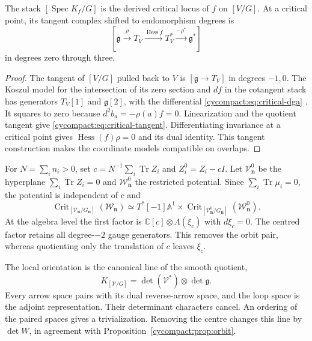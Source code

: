 \begin{proposition}\label{cycompact:prop:critical-gauge}
The stack $[\operatorname{Spec}K_f/G]$ is the derived
critical locus of $f$ on $[V/G]$. At a critical point,
its tangent complex shifted to endomorphism degrees is
\begin{equation}\label{cycompact:eq:critical-tangent}
 [\mathfrak g\xrightarrow{\rho}T_V
 \xrightarrow{\operatorname{Hess}f}T_V^*
 \xrightarrow{-\rho^*}\mathfrak g^*]
\end{equation}
in degrees zero through three.
\end{proposition}

\begin{proof}
The tangent of $[V/G]$ pulled back to $V$ is
$[\mathfrak g\to T_V]$ in degrees $-1,0$.
The Koszul model for the intersection of its zero section
and $df$ in the cotangent stack has generators
$T_V[1]$ and $\mathfrak g[2]$, with the differential
\eqref{cycompact:eq:critical-dga}
\cite[Section 4]{cycompact:BeniniSafronovSchenkel}.
It squares to zero because $d^2b_a=-\rho(a)f=0$.
Linearization and the quotient tangent give
\eqref{cycompact:eq:critical-tangent}.
Differentiating invariance at a critical point gives
$\operatorname{Hess}(f)\rho=0$ and its dual identity.
This tangent construction makes the coordinate models
compatible on overlaps.
\end{proof}

For $N=\sum_i n_i>0$, set
$c=N^{-1}\sum_i\operatorname{Tr}Z_i$ and
$Z_i^0=Z_i-cI$. Let $\mathcal V_{\mathbf n}^0$ be the
hyperplane $\sum_i\operatorname{Tr}Z_i=0$ and
$\mathcal W_{\mathbf n}^0$ the restricted potential.
Since $\sum_i\operatorname{Tr}\mu_i=0$,
the potential is independent of $c$ and
\begin{equation}\label{cycompact:eq:critical-centre}
 \operatorname{Crit}_{[\mathcal V_{\mathbf n}/G_{\mathbf n}]}
       (\mathcal W_{\mathbf n})
 \simeq T^*[-1]\mathbb A^1\times
 \operatorname{Crit}_{[\mathcal V_{\mathbf n}^0/G_{\mathbf n}]}
       (\mathcal W_{\mathbf n}^0).
\end{equation}
At the algebra level the first factor is
$\mathbb C[c]\otimes\Lambda(\xi_c)$ with $d\xi_c=0$.
The centred factor retains all degree-$-2$ gauge generators.
This removes the orbit pair, whereas quotienting only
the translation of $c$ leaves $\xi_c$.

The local orientation is the canonical line of the smooth
quotient,
\[
 K_{[\mathcal V/G]}=\det(\mathcal V^*)\otimes\det\mathfrak g.
\]
Every arrow space pairs with its dual reverse-arrow space,
and the loop space is the adjoint representation. Their
determinant characters cancel. An ordering of the paired
spaces gives a trivialization. Removing the centre changes
this line by $\det W$, in agreement with
Proposition~\ref{cycompact:prop:orbit}.

